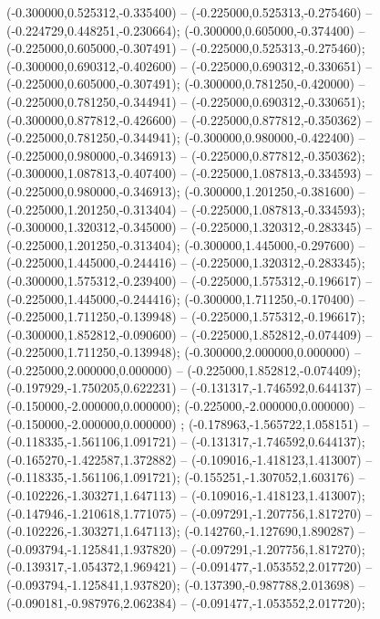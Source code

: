  (-0.300000,0.525312,-0.335400) -- (-0.225000,0.525313,-0.275460) -- (-0.224729,0.448251,-0.230664);
 (-0.300000,0.605000,-0.374400) -- (-0.225000,0.605000,-0.307491) -- (-0.225000,0.525313,-0.275460);
 (-0.300000,0.690312,-0.402600) -- (-0.225000,0.690312,-0.330651) -- (-0.225000,0.605000,-0.307491);
 (-0.300000,0.781250,-0.420000) -- (-0.225000,0.781250,-0.344941) -- (-0.225000,0.690312,-0.330651);
 (-0.300000,0.877812,-0.426600) -- (-0.225000,0.877812,-0.350362) -- (-0.225000,0.781250,-0.344941);
 (-0.300000,0.980000,-0.422400) -- (-0.225000,0.980000,-0.346913) -- (-0.225000,0.877812,-0.350362);
 (-0.300000,1.087813,-0.407400) -- (-0.225000,1.087813,-0.334593) -- (-0.225000,0.980000,-0.346913);
 (-0.300000,1.201250,-0.381600) -- (-0.225000,1.201250,-0.313404) -- (-0.225000,1.087813,-0.334593);
 (-0.300000,1.320312,-0.345000) -- (-0.225000,1.320312,-0.283345) -- (-0.225000,1.201250,-0.313404);
 (-0.300000,1.445000,-0.297600) -- (-0.225000,1.445000,-0.244416) -- (-0.225000,1.320312,-0.283345);
 (-0.300000,1.575312,-0.239400) -- (-0.225000,1.575312,-0.196617) -- (-0.225000,1.445000,-0.244416);
 (-0.300000,1.711250,-0.170400) -- (-0.225000,1.711250,-0.139948) -- (-0.225000,1.575312,-0.196617);
 (-0.300000,1.852812,-0.090600) -- (-0.225000,1.852812,-0.074409) -- (-0.225000,1.711250,-0.139948);
 (-0.300000,2.000000,0.000000) -- (-0.225000,2.000000,0.000000) -- (-0.225000,1.852812,-0.074409);
 (-0.197929,-1.750205,0.622231) -- (-0.131317,-1.746592,0.644137) -- (-0.150000,-2.000000,0.000000);
 (-0.225000,-2.000000,0.000000) -- (-0.150000,-2.000000,0.000000) ;
 (-0.178963,-1.565722,1.058151) -- (-0.118335,-1.561106,1.091721) -- (-0.131317,-1.746592,0.644137);
 (-0.165270,-1.422587,1.372882) -- (-0.109016,-1.418123,1.413007) -- (-0.118335,-1.561106,1.091721);
 (-0.155251,-1.307052,1.603176) -- (-0.102226,-1.303271,1.647113) -- (-0.109016,-1.418123,1.413007);
 (-0.147946,-1.210618,1.771075) -- (-0.097291,-1.207756,1.817270) -- (-0.102226,-1.303271,1.647113);
 (-0.142760,-1.127690,1.890287) -- (-0.093794,-1.125841,1.937820) -- (-0.097291,-1.207756,1.817270);
 (-0.139317,-1.054372,1.969421) -- (-0.091477,-1.053552,2.017720) -- (-0.093794,-1.125841,1.937820);
 (-0.137390,-0.987788,2.013698) -- (-0.090181,-0.987976,2.062384) -- (-0.091477,-1.053552,2.017720);

